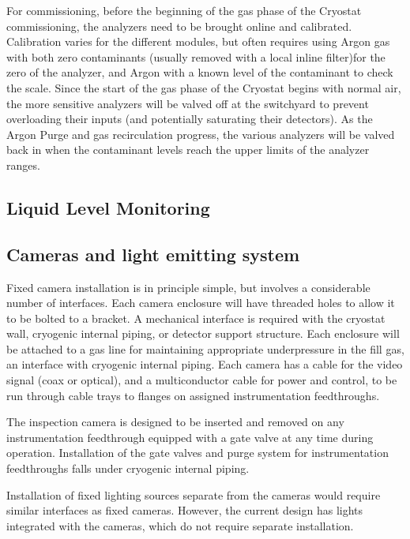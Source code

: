 For commissioning, before the beginning of the gas phase of the Cryostat commissioning, the analyzers need to be brought online and calibrated. Calibration varies for the different modules, but often requires using Argon gas with both zero contaminants (usually removed with a local inline filter)for the zero of the analyzer, and Argon with a known level of the contaminant to check the scale. Since the start of the gas phase of the Cryostat begins with normal air, the more sensitive analyzers will be valved off at the switchyard to prevent overloading their inputs (and potentially saturating their detectors). As the Argon Purge and gas recirculation progress, the various analyzers will be valved back in when the contaminant levels reach the upper limits of the analyzer ranges. 

\subsection{Liquid Level Monitoring}
\label{sec:fdgen-slow-cryo-install-llm}


\subsection{Cameras and light emitting system}
\label{sec:fdgen-slow-cryo-install-c}

Fixed camera installation is in principle simple, but involves a
considerable number of interfaces. Each camera enclosure will have
threaded holes to allow it to be bolted to a bracket. A mechanical
interface is required with the cryostat wall, cryogenic internal
piping, or detector support structure. Each enclosure will be attached
to a gas line for maintaining appropriate underpressure in the fill
gas, an interface with cryogenic internal piping. Each camera has a
cable for the video signal (coax or optical), and a multiconductor
cable for power and control, to be run through cable trays to flanges
on assigned instrumentation feedthroughs.

The inspection camera is designed to be inserted and removed on any
instrumentation feedthrough equipped with a gate valve at any time
during operation.  Installation of the gate valves and purge system
for instrumentation feedthroughs falls under cryogenic internal
piping.

Installation of fixed lighting sources separate from the cameras would
require similar interfaces as fixed cameras.  However, the current
design has lights integrated with the cameras, which do not require separate
installation.



